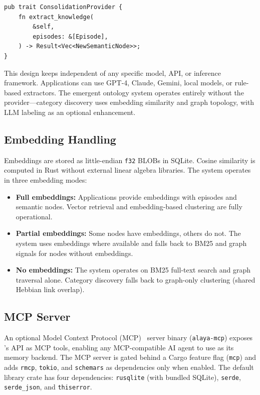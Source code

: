 \begin{lstlisting}[caption={Provider trait (simplified)}]
pub trait ConsolidationProvider {
    fn extract_knowledge(
        &self,
        episodes: &[Episode],
    ) -> Result<Vec<NewSemanticNode>>;
}
\end{lstlisting}

This design keeps \alaya{} independent of any specific model, API, or
inference framework. Applications can use GPT-4, Claude, Gemini, local
models, or rule-based extractors. The emergent ontology system operates
entirely without the provider---category discovery uses embedding similarity
and graph topology, with LLM labeling as an optional enhancement.

\subsection{Embedding Handling}

Embeddings are stored as little-endian \texttt{f32} BLOBs in SQLite.
Cosine similarity is computed in Rust without external linear algebra
libraries. The system operates in three embedding modes:

\begin{itemize}[nosep]
    \item \textbf{Full embeddings:} Applications provide embeddings with
    episodes and semantic nodes. Vector retrieval and embedding-based
    clustering are fully operational.
    \item \textbf{Partial embeddings:} Some nodes have embeddings, others do
    not. The system uses embeddings where available and falls back to BM25
    and graph signals for nodes without embeddings.
    \item \textbf{No embeddings:} The system operates on BM25 full-text
    search and graph traversal alone. Category discovery falls back to
    graph-only clustering (shared Hebbian link overlap).
\end{itemize}

\subsection{MCP Server}

An optional Model Context Protocol (MCP)~\cite{anthropic2024mcp} server
binary (\texttt{alaya-mcp}) exposes \alaya{}'s API as MCP tools, enabling
any MCP-compatible AI agent to use \alaya{} as its memory backend. The MCP
server is gated behind a Cargo feature flag (\texttt{mcp}) and adds
\texttt{rmcp}, \texttt{tokio}, and \texttt{schemars} as dependencies only
when enabled. The default library crate has four dependencies:
\texttt{rusqlite} (with bundled SQLite), \texttt{serde},
\texttt{serde\_json}, and \texttt{thiserror}.

